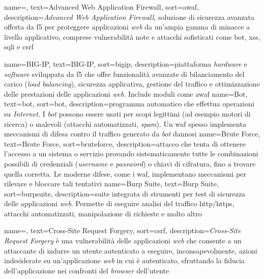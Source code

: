 

 {
    name=,
    text=Advanced Web Application Firewall,
    sort=awaf,
    description={\emph{Advanced Web Application Firewall}, soluzione di sicurezza avanzata offerta da \gls{f5} per proteggere applicazioni \emph{web} da un'ampia gamma di minacce a livello applicativo, comprese vulnerabilità note e attacchi sofisticati come \gls{bot}, \gls{xss}, \gls{sqli} e \gls{csrf}}
}

 {
    name=BIG-IP,
    text=BIG-IP,
    sort=bigip,
    description={piattaforma \emph{hardware} e \emph{software} sviluppata da \gls{f5} che offre funzionalità avanzate di bilanciamento del carico (\emph{load balancing}), sicurezza applicativa, gestione del traffico e ottimizzazione delle prestazioni delle applicazioni \emph{web}. Include moduli come \gls{awaf}}
}
 {
    name=Bot,
    text=bot,
    sort=bot,
    description={programma automatico che effettua operazioni su \emph{Internet}. I \emph{bot} possono essere usati per scopi legittimi (ad esempio motori di ricerca) o malevoli (attacchi automatizzati, \emph{spam}). Un \gls{waf} spesso implementa meccanismi di difesa contro il traffico generato da \emph{bot} dannosi}
}
 {
    name=Brute Force,
    text=Brute Force,
    sort=bruteforce,
    description={attacco che tenta di ottenere l'accesso a un sistema o servizio provando sistematicamente tutte le combinazioni possibili di credenziali (\emph{username} e \emph{password}) o chiavi di cifratura, fino a trovare quella corretta. Le moderne difese, come i \gls{waf}, implementano meccanismi per rilevare e bloccare tali tentativi}
}
 {
    name=Burp Suite,
    text=Burp Suite,
    sort=burpsuite,
    description={suite integrata di strumenti per test di sicurezza delle applicazioni \emph{web}. Permette di eseguire analisi del traffico \gls{http}/\gls{https}, attacchi automatizzati, manipolazione di richieste e molto altro} 
}

 {
    name=,
    text=Cross-Site Request Forgery,
    sort=csrf,
    description={\emph{Cross-Site Request Forgery} è una vulnerabilità delle applicazioni \emph{web} che consente a un attaccante di indurre un utente autenticato a eseguire, inconsapevolmente, azioni indesiderate su un'applicazione \emph{web} in cui è autenticato, sfruttando la fiducia dell'applicazione nei confronti del \emph{browser} dell'utente}
}

